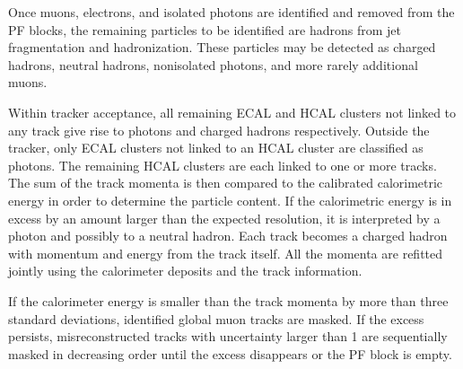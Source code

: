 Once muons, electrons, and isolated photons are identified and removed from the PF blocks,
the remaining particles to be identified are hadrons from jet fragmentation and hadronization.
These particles may be detected as charged hadrons, neutral hadrons, nonisolated photons, and more rarely additional muons.

Within tracker acceptance, all remaining ECAL and HCAL clusters not linked to any track give rise to photons and charged hadrons respectively.
Outside the tracker, only ECAL clusters not linked to an HCAL cluster are classified as photons.
The remaining HCAL clusters are each linked to one or more tracks.
The sum of the track momenta is then compared to the calibrated calorimetric energy in order to determine the particle content.
If the calorimetric energy is in excess by an amount larger than the expected resolution,
it is interpreted by a photon and possibly to a neutral hadron.
Each track becomes a charged hadron with momentum and energy from the track itself.
All the momenta are refitted jointly using the calorimeter deposits and the track information.

If the calorimeter energy is smaller than the track momenta by more than three standard deviations,
identified global muon tracks are masked.
If the excess persists, misreconstructed tracks with \pt uncertainty larger than 1\GeV
are sequentially masked in decreasing \pt order until the excess disappears or the PF block is empty.
